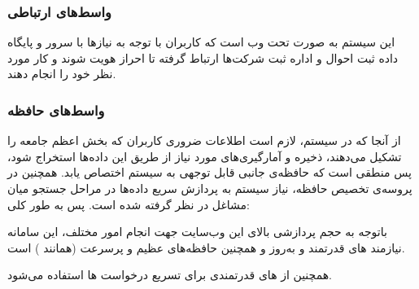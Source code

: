 \documentclass[12pt,svgnames,oneside]{book}
\newcounter{itemadded}
\let\LaTeXStandardEnumerateBegin\enumerate
\let\LaTeXStandardEnumerateEnd\endenumerate
\renewenvironment{enumerate}{%
\LaTeXStandardEnumerateBegin%
\setcounter{itemadded}{0}
}{%
\LaTeXStandardEnumerateEnd%
}%
\begin{document}
\subsubsection{واسط‌های ارتباطی}
این سیستم به صورت تحت‌ وب است که کاربران با توجه به نیاز‌ها با سرور و پایگاه داده ثبت احوال و اداره ثبت شرکت‌ها ارتباط گرفته تا احراز هویت شوند و کار مورد نظر خود را انجام دهند.

\subsubsection{واسط‌های حافظه}
از آنجا که در سیستم، لازم است اطلاعات ضروری کاربران که بخش اعظم جامعه را تشکیل می‌دهند، ذخیره و آمارگیری‌های مورد نیاز از طریق این داده‌ها استخراج شود، پس منطقی است که حافظه‌ی جانبی قابل توجهی به سیستم اختصاص یابد. همچنین در					پروسه‌ی تخصیص حافظه، نیاز سیستم به پردازش سریع داده‌ها در مراحل جستجو میان مشاغل در نظر گرفته شده ‌است.					پس به طور کلی:

\begin{enumerate}
\item
باتوجه به حجم پردازشی بالای این وب‌سایت جهت انجام امور مختلف، این سامانه نیازمند های قدرتمند و به‌روز و همچنین حافظه‌های عظیم و پرسرعت (همانند ) است.

\item
همچنین از های قدرتمندی برای تسریع درخواست ها استفاده می‌شود.
\end{enumerate}
\end{document}
